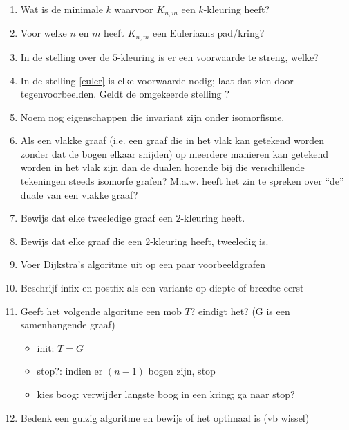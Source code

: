 \begin{enumerate}
\item Wat is de minimale $k$ waarvoor $K_{n,m}$ een $k$-kleuring heeft?

\item Voor welke $n$ en $m$ heeft $K_{n,m}$ een Euleriaans pad/kring?

\item In de stelling over de $5$-kleuring is er een voorwaarde te
streng, welke?

\item In de stelling \ref{euler} is elke voorwaarde nodig; laat dat
zien door tegenvoorbeelden. Geldt de omgekeerde stelling ?

\item Noem nog eigenschappen die invariant zijn onder isomorfisme.

\item %
  Als een vlakke graaf (i.e. een graaf die in het vlak kan getekend
  worden zonder dat de bogen elkaar snijden) op meerdere manieren kan
  getekend worden in het vlak
  zijn dan de dualen horende bij die verschillende tekeningen steeds
  isomorfe grafen? M.a.w. heeft het zin te spreken over ``de'' duale
  van een vlakke graaf?

\item Bewijs dat elke tweeledige graaf een $2$-kleuring heeft.

\item Bewijs dat elke graaf die een $2$-kleuring heeft, tweeledig
is.

\item Voer Dijkstra's algoritme uit op een paar voorbeeldgrafen

\item Beschrijf infix en postfix als een variante op diepte of
breedte eerst

\item Geeft het volgende algoritme een mob $T$? eindigt het? (G is een
  samenhangende graaf)
\begin{itemize}
\item
init: $T = G$
\item
stop?: indien er $(n-1)$ bogen zijn, stop
\item
kies boog: verwijder langste boog in een kring; ga naar stop?
\end{itemize}

\item Bedenk een gulzig algoritme en bewijs of het optimaal is
(vb wissel)


\end{enumerate}
